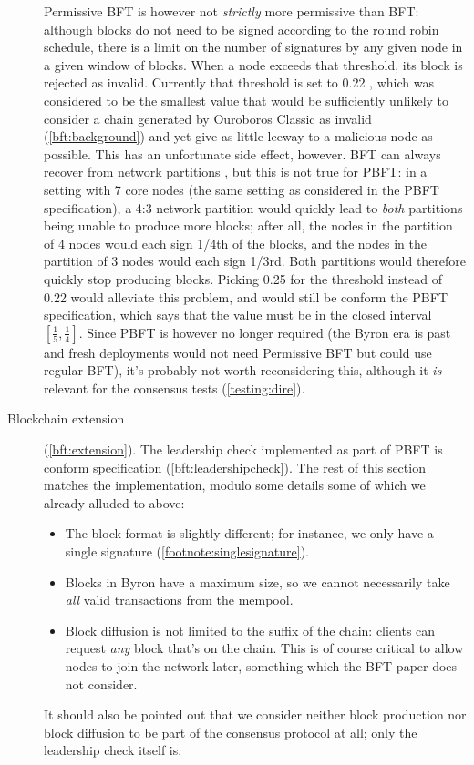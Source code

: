 \begin{description}
  Permissive BFT is however not \emph{strictly} more permissive than BFT:
  although blocks do not need to be signed according to the round robin
  schedule, there is a limit on the number of signatures by any given node in a
  given window of blocks. When a node exceeds that threshold, its block is
  rejected as invalid. Currently that threshold is set to 0.22 \cite[Appendix A,
  Calculating the $t$ parameter]{byron-chain-spec}, which was considered to be
  the smallest value that would be sufficiently unlikely to consider a chain
  generated by Ouroboros Classic as invalid (\cref{bft:background}) and yet give
  as little leeway to a malicious node as possible. This has an unfortunate side
  effect, however. BFT can always recover from network partitions \cite[Section
  1, Introduction]{cryptoeprint:2018:1049}, but this is not true for PBFT: in a
  setting with 7 core nodes (the same setting as considered in the PBFT
  specification), a 4:3 network partition would quickly lead to \emph{both}
  partitions being unable to produce more blocks; after all, the nodes in the
  partition of 4 nodes would each sign 1/4th of the blocks, and the nodes in the
  partition of 3 nodes would each sign 1/3rd. Both partitions would therefore
  quickly stop producing blocks. Picking 0.25 for the threshold instead of 0.22
  would alleviate this problem, and would still be conform the PBFT
  specification, which says that the value must be in the closed interval
  $[\frac{1}{5}, \frac{1}{4}]$. Since PBFT is however no longer required (the
  Byron era is past and fresh deployments would not need Permissive BFT but
  could use regular BFT), it's probably not worth reconsidering this, although
  it \emph{is} relevant for the consensus tests (\cref{testing:dire}).
%
  \item[Blockchain extension] (\cref{bft:extension}).
  The leadership check implemented as part of PBFT is conform specification
  (\cref{bft:leadershipcheck}). The rest of this section matches the
  implementation, modulo some details some of which we already alluded to above:
%
  \begin{itemize}
    \item The block format is slightly different; for instance, we only have a
    single signature (\cref{footnote:singlesignature}).
    \item Blocks in Byron have a maximum size, so we cannot necessarily take
    \emph{all} valid transactions from the mempool.
    \item Block diffusion is not limited to the suffix of the chain: clients
    can request \emph{any} block that's on the chain. This is of course critical
    to allow nodes to join the network later, something which the BFT paper does
    not consider.
  \end{itemize}
%
  It should also be pointed out that we consider neither block production nor
  block diffusion to be part of the consensus protocol at all; only the
  leadership check itself is.


\end{description}
